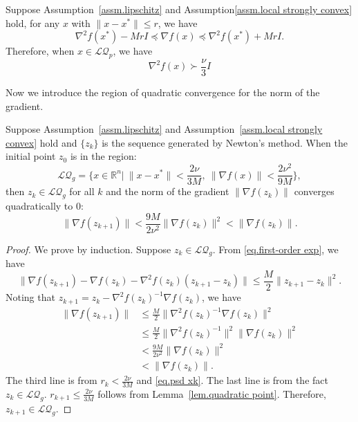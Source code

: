 \documentclass{mcom-l}
\numberwithin{equation}{section}
\begin{document}
\begin{lemma}
    Suppose Assumption~\ref{assm.lipschitz} and Assumption\ref{assm.local strongly convex} hold, for any $x$ with $\|x-x^*\| \leq r$, we have
    \begin{equation}
        \label{eq.psd region}
        \nabla^2 f(x^*)-MrI\preceq \nabla f(x) \preceq \nabla^2 f(x^*)+MrI.
    \end{equation}
    Therefore, when $x\in \mathcal{LQ}_p$, we have
    \begin{equation}
        \label{eq.psd xk}
        \nabla^2 f(x) \succ \frac{\nu}{3}I
    \end{equation}
\end{lemma}
Now we introduce the region of quadratic convergence for the norm of the gradient.
\begin{lemma}
    \label{lem.quadratic gradient}
    Suppose Assumption~\ref{assm.lipschitz} and Assumption~\ref{assm.local strongly convex} hold and $\{z_k\}$ is the sequence generated by Newton's method. When the initial point $z_0$ is in the region:
    \begin{equation}
        \label{eq.local quadratic region gradient}
        \mathcal{LQ}_g = \{x\in\mathbb{R}^n| \ \|x-x^*\| < \frac{2\nu}{3M}, \ \|\nabla f(x)\|< \frac{2\nu^2}{9M}\},
    \end{equation}
    then $z_k \in \mathcal{LQ}_g$ for all $k$ and the norm of the gradient $\|\nabla f(z_k)\|$ converges quadratically to $0$:
    \begin{equation}
        \label{eq.quadratic convergence gradient}
        \|\nabla f(z_{k+1})\| < \frac{9M}{2\nu^2}\|\nabla f(z_k)\|^2<\|\nabla f(z_k)\|.
    \end{equation}
\end{lemma}
\begin{proof}
    We prove by induction. Suppose $z_k\in \mathcal{LQ}_g$. From \eqref{eq.first-order exp}, we have
    \begin{equation*}
        \|\nabla f(z_{k+1}) -\nabla f(z_k)-\nabla^2 f(z_k)(z_{k+1}-z_k)\| \leq \frac{M}{2}\|z_{k+1}-z_k\|^2.
    \end{equation*}
    Noting that $z_{k+1} = z_k-\nabla^2 f(z_k)^{-1}\nabla f(z_k)$, we have
    \begin{equation*}
        \begin{aligned}
            \|\nabla f(z_{k+1})\| & \leq \frac{M}{2}\|\nabla^2 f(z_k)^{-1} \nabla f(z_k)\|^2       \\
                                  & \leq \frac{M}{2}\|\nabla^2 f(z_k)^{-1}\|^2\| \nabla f(z_k)\|^2 \\
                                  & < \frac{9M}{2\nu^2}\|\nabla f(z_k)\|^2                         \\
                                  & < \|\nabla f(z_k)\|.
        \end{aligned}
    \end{equation*}
    The third line is from $r_k< \frac{2\nu}{3M}$ and \eqref{eq.psd xk}. The last line is from the fact $z_k\in \mathcal{LQ}_g$. $r_{k+1} \leq \frac{2\nu}{3M}$ follows from Lemma~\ref{lem.quadratic point}. Therefore, $z_{k+1}\in \mathcal{LQ}_g$.
\end{proof}
\end{document}
